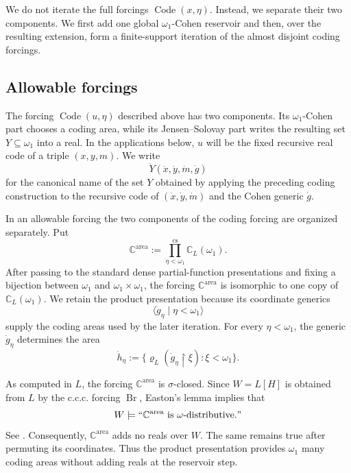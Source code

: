 \documentclass[a4paper,11pt]{article}
\newcommand{\forceC}{\mathbb{C}}
\begin{document}
We do not iterate the full forcings $\operatorname{Code}(x,\eta)$. Instead, we separate their two components. We first add one global $\omega_1$-Cohen reservoir and then, over the resulting extension, form a finite-support iteration of the almost disjoint coding forcings.


\subsection{Allowable forcings}
\label{subsection-allowable-forcings}

The forcing $\operatorname{Code}(u,\eta)$ described above has two components. Its $\omega_1$-Cohen part chooses a coding area, while its Jensen--Solovay part writes the resulting set $Y\subseteq\omega_1$ into a real. In the applications below, $u$ will be the fixed recursive real code of a triple $(x,y,m)$. We write
\[
   \dot Y(\dot x,\dot y,\dot m,\dot g)
\]
for the canonical name of the set $Y$ obtained by applying the preceding coding construction to the recursive code of $(\dot x,\dot y,\dot m)$ and the Cohen generic $\dot g$.

In an allowable forcing the two components of the coding forcing are organized separately. Put
\[
   \forceC^{\mathrm{area}}
   :=\prod_{\eta<\omega_1}^{\mathrm{cs}}\mathbb C_L(\omega_1).
\]
After passing to the standard dense partial-function presentations and fixing a bijection between $\omega_1$ and $\omega_1\times\omega_1$, the forcing $\forceC^{\mathrm{area}}$ is isomorphic to one copy of $\mathbb C_L(\omega_1)$. We retain the product presentation because its coordinate generics
\[
   \langle\dot g_\eta\mid\eta<\omega_1\rangle
\]
supply the coding areas used by the later iteration. For every $\eta<\omega_1$, the generic $\dot g_\eta$ determines the area
\[
   \dot h_\eta
   :=\{\varrho_L(\dot g_\eta\restriction\xi):\xi<\omega_1\}.
\]

As computed in $L$, the forcing $\forceC^{\mathrm{area}}$ is $\sigma$-closed. Since $W=L[H]$ is obtained from $L$ by the c.c.c. forcing $\operatorname{Br}$, Easton's lemma implies that
\[
   W\models
   ``\forceC^{\mathrm{area}}\text{ is }\omega\text{-distributive}."
\]
See \cite[Chapter~15]{Jech}. Consequently, $\forceC^{\mathrm{area}}$ adds no reals over $W$. The same remains true after permuting its coordinates. Thus the product presentation provides $\omega_1$ many coding areas without adding reals at the reservoir step.
\end{document}
